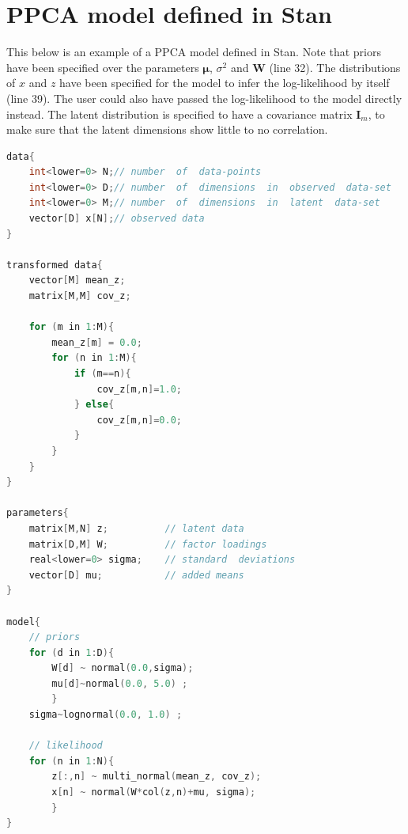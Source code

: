 \chapter{PPCA model defined in Stan}\label{AP:ppca_stan}

This below is an example of a PPCA model defined in Stan. Note that priors have been specified over the parameters $\bm{\mu}$, $\sigma^2$ and $\bm{W}$ (line 32). The distributions of $x$ and $z$ have been specified for the model to infer the log-likelihood by itself (line 39). The user could also have passed the log-likelihood to the model directly instead. The latent distribution is specified to have a covariance matrix $\bm{I}_m$, to make sure that the latent dimensions show little to no correlation.

\begin{lstlisting}[caption={PCPA model defined in Stan}, label={lst:ppca}, language=C++]
data{
    int<lower=0> N;// number  of  data-points
    int<lower=0> D;// number  of  dimensions  in  observed  data-set
    int<lower=0> M;// number  of  dimensions  in  latent  data-set
    vector[D] x[N];// observed data
}

transformed data{
    vector[M] mean_z;
    matrix[M,M] cov_z;
    
    for (m in 1:M){
        mean_z[m] = 0.0;
        for (n in 1:M){
            if (m==n){
                cov_z[m,n]=1.0;
            } else{
                cov_z[m,n]=0.0;
            }
        }
    }
}

parameters{
    matrix[M,N] z;          // latent data
    matrix[D,M] W;          // factor loadings
    real<lower=0> sigma;    // standard  deviations
    vector[D] mu;           // added means
}

model{
    // priors
    for (d in 1:D){
        W[d] ~ normal(0.0,sigma);
        mu[d]~normal(0.0, 5.0) ;
        }
    sigma~lognormal(0.0, 1.0) ;
    
    // likelihood
    for (n in 1:N){
        z[:,n] ~ multi_normal(mean_z, cov_z);
        x[n] ~ normal(W*col(z,n)+mu, sigma);
        }    
}
\end{lstlisting}




